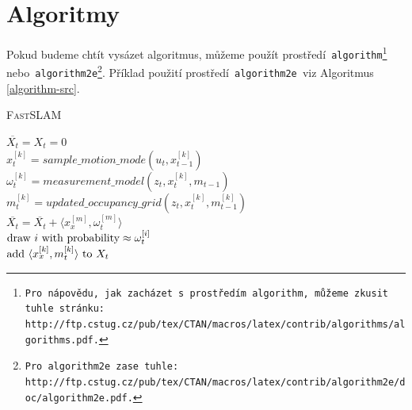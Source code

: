 \documentclass[a4paper, 11pt]{article}
\begin{document}
\section{Algoritmy} \label{algorithm}
Pokud budeme chtít vysázet algoritmus, můžeme použít prostředí\texttt{ algorithm\footnote{Pro nápovědu, jak zacházet s prostředím\texttt{ algorithm, }můžeme zkusit tuhle 
stránku:\\http://ftp.cstug.cz/pub/tex/CTAN/macros/latex/contrib/algorithms/algorithms.pdf.} } 
nebo\texttt{ algorithm2e\footnote{Pro\texttt{ algorithm2e }zase tuhle: http://ftp.cstug.cz/pub/tex/CTAN/macros/latex/contrib/algorithm2e/doc/algorithm2e.pdf.}}.
Příklad použití prostředí\texttt{ algorithm2e }viz Algoritmus \ref{algorithm-src}. 
\bigskip
\begin{algorithm}[h]
\label{algorithm-src}
\caption{\textsc{Fast}SLAM}
\SetInd{1em}{1em}
\SetNlSkip{-1.20em}
\SetNlSty{}{}{:}
\BlankLine
\Indp \Indp
$\overline{X_t} = X_t = 0$\\
{
	$x^{[k]}_{t} = sample\_motion\_mode(u_t ,x^{[k]}_{t-1})$\\
	$\omega^{[k]}_{t} = measurement\_model(z_t ,x^{[k]}_{t}, m_{t-1})$\\
	$m^{[k]}_{t} = updated\_occupancy\_grid(z_t ,x^{[k]}_{t}, m_{t-1}^{[k]})$\\
	$\overline{X_t} = \overline{X_t} + \langle x^{[m]}_{x}, \omega^{[m]}_{t} \rangle$\\
}
{
	$\textnormal{draw } i \textnormal{ with probability} \approx \omega^{[i]}_{t}$\\
	$\textnormal{add } \langle x^{[k]}_{x}, m^{[k]}_{t} \rangle \textnormal{ to } X_t$\\
}
\end{algorithm}
\end{document}
